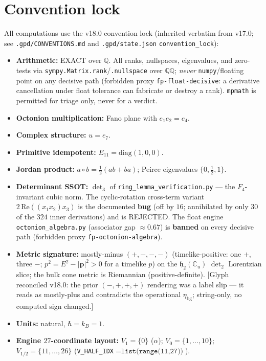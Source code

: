\documentclass[11pt]{article}
\newcommand{\Eoneone}{E_{11}}
\newcommand{\Vhalf}{V_{1/2}}
\newcommand{\jord}{\circ}
\begin{document}
\section{Convention lock}
\label{sec:conventions}
All computations use the v18.0 convention lock (inherited verbatim from v17.0;
see \texttt{.gpd/CONVENTIONS.md} and \texttt{.gpd/state.json}
\texttt{convention\_lock}):
\begin{itemize}
  \item \textbf{Arithmetic:} EXACT over $\mathbb{Q}$. All ranks, nullspaces,
    eigenvalues, and zero-tests via \texttt{sympy.Matrix.rank}/\texttt{.nullspace}
    over $\mathbb{Q}\mathbb{Q}$; \emph{never} \texttt{numpy}/floating point on any
    decisive path (forbidden proxy \texttt{fp-float-decisive}: a derivative
    cancellation under float tolerance can fabricate or destroy a rank).
    \texttt{mpmath} is permitted for triage only, never for a verdict.
  \item \textbf{Octonion multiplication:} Fano plane with $e_1 e_2 = e_4$.
  \item \textbf{Complex structure:} $u=e_7$.
  \item \textbf{Primitive idempotent:} $\Eoneone=\mathrm{diag}(1,0,0)$.
  \item \textbf{Jordan product:} $a\jord b=\tfrac12(ab+ba)$; Peirce eigenvalues
    $\{0,\tfrac12,1\}$.
  \item \textbf{Determinant SSOT:} $\det_3$ of \texttt{ring\_lemma\_verification.py}
    --- the $F_4$-invariant cubic norm. The cyclic-rotation cross-term variant
    $2\,\mathrm{Re}((x_1 x_2)x_3)$ is the documented \textbf{bug} (off by $16$;
    annihilated by only $30$ of the $324$ inner derivations) and is REJECTED. The
    float engine \texttt{octonion\_algebra.py} (associator gap $\approx 0.67$) is
    \textbf{banned} on every decisive path (forbidden proxy
    \texttt{fp-octonion-algebra}).
  \item \textbf{Metric signature:} mostly-minus $(+,-,-,-)$ (timelike-positive:
    one $+$, three $-$; $p^2=E^2-|\mathbf{p}|^2>0$ for a timelike $p$) on the
    $\mathfrak{h}_2(\mathbb{C}_u)$ $\det_2$ Lorentzian slice; the bulk cone
    metric is Riemannian (positive-definite). [Glyph reconciled v18.0: the prior
    $(-,+,+,+)$ rendering was a label slip --- it reads as mostly-plus and
    contradicts the operational $\eta_{\mathrm{bg}}$; string-only, no computed
    sign changed.]
  \item \textbf{Units:} natural, $\hbar=k_B=1$.
  \item \textbf{Engine $27$-coordinate layout:} $V_1=\{0\}$ ($\alpha$);
    $V_0=\{1,\dots,10\}$; $\Vhalf=\{11,\dots,26\}$
    (\texttt{V\_HALF\_IDX}$=\texttt{list(range(11,27))}$).
\end{itemize}
\end{document}
